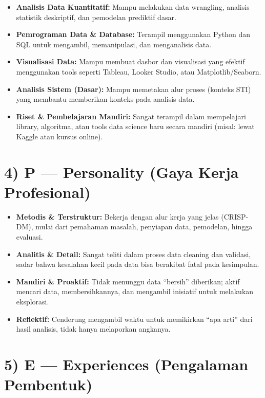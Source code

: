 \documentclass[
  letterpaper,
  DIV=11,
  numbers=noendperiod]{scrreprt}
\providecommand{\tightlist}{%
  \setlength{\itemsep}{0pt}\setlength{\parskip}{0pt}}
\begin{document}
\begin{itemize}
\tightlist
\item
  \textbf{Analisis Data Kuantitatif:} Mampu melakukan data wrangling,
  analisis statistik deskriptif, dan pemodelan prediktif dasar.
\item
  \textbf{Pemrograman Data \& Database:} Terampil menggunakan Python dan
  SQL untuk mengambil, memanipulasi, dan menganalisis data.
\item
  \textbf{Visualisasi Data:} Mampu membuat dasbor dan visualisasi yang
  efektif menggunakan tools seperti Tableau, Looker Studio, atau
  Matplotlib/Seaborn.
\item
  \textbf{Analisis Sistem (Dasar):} Mampu memetakan alur proses (konteks
  STI) yang membantu memberikan konteks pada analisis data.
\item
  \textbf{Riset \& Pembelajaran Mandiri:} Sangat terampil dalam
  mempelajari library, algoritma, atau tools data science baru secara
  mandiri (misal: lewat Kaggle atau kursus online).
\end{itemize}

\section{4) P --- Personality (Gaya Kerja
Profesional)}\label{p-personality-gaya-kerja-profesional}

\begin{itemize}
\tightlist
\item
  \textbf{Metodis \& Terstruktur:} Bekerja dengan alur kerja yang jelas
  (CRISP-DM), mulai dari pemahaman masalah, penyiapan data, pemodelan,
  hingga evaluasi.
\item
  \textbf{Analitis \& Detail:} Sangat teliti dalam proses data cleaning
  dan validasi, sadar bahwa kesalahan kecil pada data bisa berakibat
  fatal pada kesimpulan.
\item
  \textbf{Mandiri \& Proaktif:} Tidak menunggu data ``bersih''
  diberikan; aktif mencari data, membersihkannya, dan mengambil
  inisiatif untuk melakukan eksplorasi.
\item
  \textbf{Reflektif:} Cenderung mengambil waktu untuk memikirkan ``apa
  arti'' dari hasil analisis, tidak hanya melaporkan angkanya.
\end{itemize}

\section{5) E --- Experiences (Pengalaman
Pembentuk)}\label{e-experiences-pengalaman-pembentuk}
\end{document}
